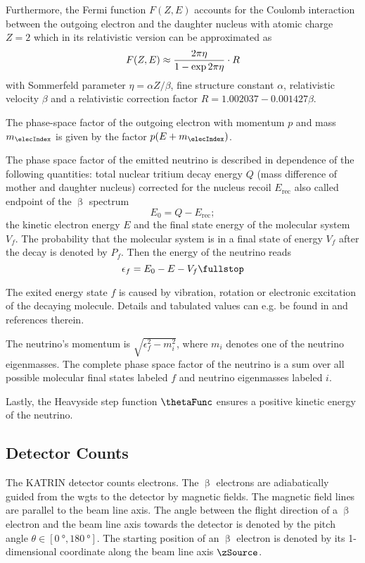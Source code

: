 Furthermore, the Fermi function $F(Z,E)$ accounts for the Coulomb interaction between the outgoing electron and the daughter nucleus with atomic charge $Z=2$ which in its relativistic version can be approximated as
\begin{equation}
    F(Z,E) \approx \frac{2 \pi \eta}{1-\exp{2 \pi \eta}} \cdot R \\
\end{equation}
with Sommerfeld parameter $\eta = \alpha Z / \beta$, fine structure constant $\alpha$, relativistic velocity $\beta$ and a relativistic correction factor $R = 1.002037-0.001427\beta$.

The phase-space factor of the outgoing electron with momentum $p$ and mass $m_\elecIndex$ is given by the factor $p(E+m_\elecIndex)$.

The phase space factor of the emitted neutrino is described in dependence of the following quantities: total nuclear tritium decay energy $Q$ (mass difference of mother and daughter nucleus) corrected for the nucleus recoil $E_\mathrm{rec}$ also called endpoint of the $\upbeta$ spectrum
\begin{equation}
    \label{eq:endpoint}
    E_0 = Q-E_\mathrm{rec};
\end{equation}
the kinetic electron energy $E$ and the final state energy of the molecular system $V_f$. The probability that the molecular system is in a final state of energy $V_f$ after the decay is denoted by $P_f$. Then the energy of the neutrino reads 
\begin{equation}
    \epsilon_f = E_0 - E - V_f \fullstop
\end{equation}

The exited energy state $f$ is caused by vibration, rotation or electronic excitation of the decaying molecule. Details and tabulated values can e.g. be found in \cite{Bodine2015} and references therein.

The neutrino's momentum is $\sqrt{\epsilon_f^2-m^2_i}$, where $m_i$ denotes one of the neutrino eigenmasses. The complete phase space factor of the neutrino is a sum over all possible molecular final states labeled $f$ and neutrino eigenmasses labeled $i$.

Lastly, the Heavyside step function $\thetaFunc$ ensures a positive kinetic energy of the neutrino.

\subsection{Detector Counts}
The KATRIN detector counts electrons. The $\upbeta$ electrons are adiabatically guided from the \gls{wgts} to the detector by magnetic fields. The magnetic field lines are parallel to the beam line axis. The angle between the flight direction of a $\upbeta$ electron and the beam line axis towards the detector is denoted by the pitch angle $\theta \in [\SI{0}{\degree}, \SI{180}{\degree}]$. The starting position of an $\upbeta$ electron is denoted by its 1-dimensional coordinate along the beam line axis $\zSource$. 

